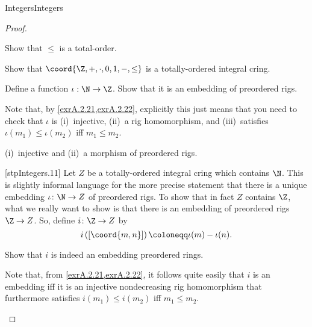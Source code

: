 \begin{thm}{Integers}{Integers}
\begin{proof}
\begin{exr}[breakable=false]{}{}
Show that $\leq$ is a total-order.
\end{exr}

\begin{exr}[breakable=false]{}{}
Show that $\coord{\Z ,+,\cdot ,0,1,-,\leq}$ is a totally-ordered integral cring.
\end{exr}

\begin{exr}[breakable=false]{}{}
Define a function $\iota :\N \rightarrow \Z$.  Show that it is an embedding of preordered rigs.
\begin{rmk}
Note that, by \cref{exrA.2.21,exrA.2.22}, explicitly this just means that you need to check that $\iota $ is (i)~injective, (ii)~a rig homomorphism, and (iii)~satisfies $\iota (m_1)\leq \iota (m_2)$ iff $m_1\leq m_2$.
\end{rmk}

(i)~injective and (ii)~a morphism of preordered rigs.
\end{exr}

[stpIntegers.11]
Let $Z$ be a totally-ordered integral cring which contains $\N$.  This is slightly informal language for the more precise statement that there is a unique embedding $\iota \colon \N \rightarrow Z$ of preordered rigs.  To show that in fact $Z$ contains $\Z$, what we really want to show is that there is an embedding of preordered rigs $\Z \rightarrow Z$.  So, define $i\colon \Z \rightarrow Z$ by
\begin{equation}
i\left( [\coord{m,n}]\right) \coloneqq \iota (m)-\iota (n).
\end{equation}
\begin{exr}[breakable=false]{}{}
Show that $i$ is indeed an embedding preordered rings.
\begin{rmk}
Note that, from \cref{exrA.2.21,exrA.2.22}, it follows quite easily that $i$ is an embedding iff it is an injective nondecreasing rig homomorphism that furthermore satisfies $i(m_1)\leq i(m_2)$ iff $m_1\leq m_2$.
\end{rmk}
\end{exr}


\end{proof}
\end{thm}
